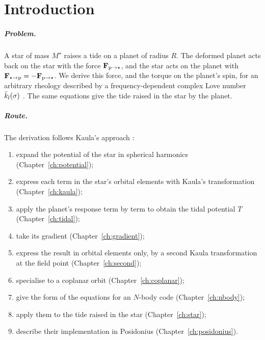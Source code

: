 \chapter{Introduction}\label{ch:intro}

\paragraph{Problem.} A star of mass $M^\star$ raises a tide on a planet of radius $R$. The deformed planet acts back on the star with the force $\mathbf F_{\mathrm p\to\star}$, and the star acts on the planet with $\mathbf F_{\star\to\mathrm p}=-\mathbf F_{\mathrm p\to\star}$. We derive this force, and the torque on the planet's spin, for an arbitrary rheology described by a frequency-dependent complex Love number $\bar k_l(\sigma)$ \citep{EfroimskyMakarov2013,EfroimskyMakarov2014}. The same equations give the tide raised in the star by the planet.

\paragraph{Route.} The derivation follows Kaula's approach \citep{Kaula1964,Kaula2000}:
\begin{enumerate}
  \item expand the potential of the star in spherical harmonics (Chapter~\ref{ch:potential});
  \item express each term in the star's orbital elements with Kaula's transformation (Chapter~\ref{ch:kaula});
  \item apply the planet's response term by term to obtain the tidal potential $T$ (Chapter~\ref{ch:tidal});
  \item take its gradient (Chapter~\ref{ch:gradient});
  \item express the result in orbital elements only, by a second Kaula transformation at the field point (Chapter~\ref{ch:second});
  \item specialise to a coplanar orbit (Chapter~\ref{ch:coplanar});
  \item give the form of the equations for an $N$-body code (Chapter~\ref{ch:nbody});
  \item apply them to the tide raised in the star (Chapter~\ref{ch:star});
  \item describe their implementation in Posidonius (Chapter~\ref{ch:posidonius}).
\end{enumerate}

